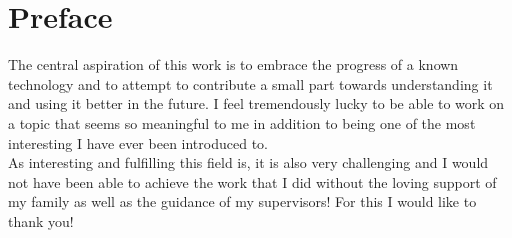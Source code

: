 \chapter{Preface}

The central aspiration of this work is to embrace the progress of a known technology and to attempt to contribute a small part towards understanding it and using it better in the future. I feel tremendously lucky to be able to work on a topic that seems so meaningful to me in addition to being one of the most interesting I have ever been introduced to. \\

As interesting and fulfilling this field is, it is also very challenging and I would not have been able to achieve the work that I did without the loving support of my family as well as the guidance of my supervisors! For this I would like to thank you!